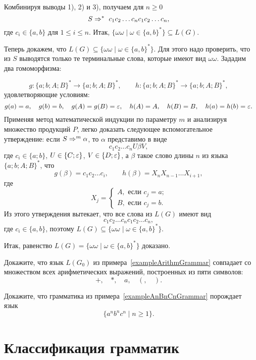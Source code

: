\begin{myexample}
Комбинируя выводы 1), 2) и 3), получаем для $n\ge 0$
\[
	S \Rightarrow^*~c_1c_2\ldots c_nc_1c_2\ldots c_n,
\]
где $c_i\in\{a,b\}$ для $1\le i\le n$. Итак, $\{\omega\omega\mid\omega\in\{a,b\}^*\}\subseteq L(G)$.

Теперь докажем, что $L(G)\subseteq\{\omega\omega\mid\omega\in\{a,b\}^*\}$. Для этого надо проверить, что из $S$ выводятся только те терминальные слова, которые имеют вид $\omega\omega$. Зададим два гомоморфизма:

\[
	g\colon\{a;b;A;B\}^* \to \{a;b;A;B\}^*, \qquad
    h\colon\{a;b;A;B\}^* \to \{a;b;A;B\}^*,
\]
удовлетворяющие условиям:
\[
    g(a)=a,  \quad
    g(b)=b, \quad
    g(A)=g(B)=\varepsilon,  \quad
    h(A)=A,  \quad
    h(B)=B,  \quad
    h(a)=h(b)=\varepsilon.
\]
Применяя метод математической индукции по параметру $m$ и анализируя множество продукций $P$, легко доказать следующее вспомогательное утверждение: если $S \Rightarrow^m \alpha$, то $\alpha$ представимо в виде
\[
    c_1c_2\ldots c_nU\beta V,
\]
где $c_i\in\{a;b\}$, $U\in\{C;\varepsilon\}$, $V\in\{D;\varepsilon\}$, а $\beta$ такое слово длины $n$ из языка $\{a;b;A;B\}^*$, что
\[
    g(\beta)=c_1c_2\ldots c_i, \qquad
    h(\beta)=X_nX_{n-1}\ldots X_{i+1},
\]
где
\[
    X_j =
        \begin{cases}
            A, \text{ если $c_{j}=a$;} \\
            B, \text{ если $c_{j}=b$.}
        \end{cases}
\]
Из этого утверждения вытекает, что все слова из $L(G)$ имеют вид
\[
    c_1c_2\ldots c_nc_1c_2\ldots c_n,
\]
где $c_i\in\{a,b\}$, поэтому $L(G)\subseteq\{\omega\omega\mid\omega\in\{a,b\}^*\}$.

Итак, равенство $L(G)=\{\omega\omega\mid\omega\in\{a,b\}^*\}$ доказано.
\end{myexample}

\begin{myproblem}
Докажите, что язык $L(G_0)$ из примера~\ref{exampleArithmGrammar} совпадает со множеством всех арифметических выражений, построенных из пяти символов:
\[
    +, \quad *, \quad a, \quad (, \quad ).
\]
\end{myproblem}

\begin{myproblem}
Докажите, что грамматика из примера~\ref{exampleAnBnCnGrammar} порождает язык \[\{a^nb^nc^n\mid n\ge 1\}.\]
\end{myproblem}

\section{Классификация грамматик}
\label{Chapter1GrammarsClasses}

